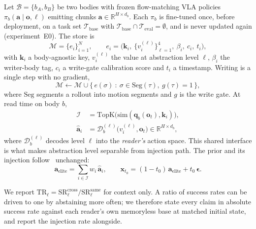 \documentclass[letterpaper, 10 pt, conference]{ieeeconf}
\begin{document}
Let $\mathcal{B}=\{b_A,b_B\}$ be two bodies with frozen flow-matching VLA
policies $\pi_b(\mathbf{a}\mid\mathbf{o},\ell)$ emitting chunks
$\mathbf{a}\in\mathbb{R}^{H\times d_b}$. Each $\pi_b$ is fine-tuned once, before
deployment, on a task set $\mathcal{T}_\mathrm{base}$ with
$\mathcal{T}_\mathrm{base}\cap\mathcal{T}_\mathrm{eval}=\emptyset$, and is never
updated again (experiment~E0). The store is
\begin{equation}
\mathcal{M}=\{e_i\}_{i=1}^{N},\qquad
e_i=\bigl(\mathbf{k}_i,\ \{v_i^{(\ell)}\}_{\ell=1}^{4},\ \beta_i,\ c_i,\ t_i\bigr),
\label{eq:entry}
\end{equation}
with $\mathbf{k}_i$ a body-agnostic key, $v_i^{(\ell)}$ the value at abstraction
level $\ell$, $\beta_i$ the writer-body tag, $c_i$ a write-gate calibration
score and $t_i$ a timestamp. Writing is a single step with no gradient,
\begin{equation}
\mathcal{M}\leftarrow\mathcal{M}\cup
\bigl\{\,e(\sigma)\ :\ \sigma\in\mathrm{Seg}(\tau),\ g(\tau)=1\,\bigr\},
\label{eq:write}
\end{equation}
where $\mathrm{Seg}$ segments a rollout into motion segments and $g$ is the write
gate. At read time on body $b$,
\begin{align}
\mathcal{I}&=\mathrm{TopK}\bigl(\mathrm{sim}(\mathbf{q}_b(\mathbf{o}_t),\mathbf{k}_i)\bigr),
\label{eq:retrieve}\\
\hat{\mathbf{a}}_i&=\mathcal{D}_b^{(\ell)}\bigl(v_i^{(\ell)},\mathbf{o}_t\bigr)
\in\mathbb{R}^{H\times d_b},
\label{eq:decode}
\end{align}
where $\mathcal{D}_b^{(\ell)}$ decodes level $\ell$ into the \emph{reader's} action
space. This shared interface is what makes abstraction level separable from
injection path. The prior and its injection follow~\cite{rts} unchanged:
\begin{equation}
\mathbf{a}_\mathrm{elite}=\sum_{i\in\mathcal{I}}w_i\,\hat{\mathbf{a}}_i,
\qquad
\mathbf{x}_{t_0}=(1-t_0)\,\mathbf{a}_\mathrm{elite}+t_0\,\boldsymbol{\epsilon}.
\label{eq:inject}
\end{equation}

We report $\mathrm{TR}_\ell=\mathrm{SR}^\mathrm{cross}_\ell/
\mathrm{SR}^\mathrm{same}_\ell$ for context only. A ratio of success rates can be
driven to one by abstaining more often; we therefore state every claim in
absolute success rate against each reader's own memoryless base at matched
initial state, and report the injection rate alongside.
\end{document}
